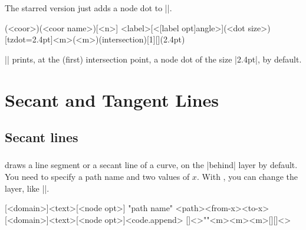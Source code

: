The starred version \icmd{\tzhXpoint*} just adds a node dot to |\tzhXpoint|.

\begin{tzdef}{}
(<coor>)(<coor name>)[<n>]
           {<label>}[<[label opt]angle>](<dot size>)
  [tzdot=2.4pt]{<m>}(<m>)(intersection)[1]{}[](2.4pt)
\end{tzdef}

|\tzhXpoint*| prints, at the (first) intersection point, a node dot of the size |2.4pt|, by default.

\begin{tzcode}{.3}
\end{tzcode}



\chapter{Secant and Tangent Lines}
\label{c:tangent}

\section{Secant lines}
\label{s:secant}

\subsection{\protect\cmd{\tzsecantat}}
\label{ss:tzsecantat}

\icmd{\tzsecantat} draws a line segment or a secant line of a curve, on the |behind| layer by default.
You need to specify a path name and two values of $x$.
With \icmd{\settzsecantlayer}, you can change the layer, like ||.

\begin{tzdef}{}
[<domain>]{<text>}[<node opt>]
"path name"
           {<path>}{<from-x>}{<to-x>}[<domain>]{<text>}[<node opt>]<code.append>
  []<>""{<m>}{<m>}{<m>}[]{}[]<>
\end{tzdef}

